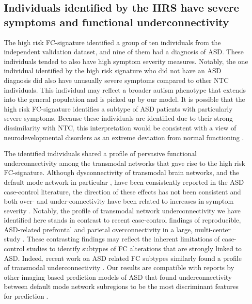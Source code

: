 \documentclass[9pt,lineno]{elife}
\begin{document}
\subsection{Individuals identified by the HRS have severe symptoms and functional underconnectivity}
The high risk FC-signature identified a group of ten individuals from the independent validation dataset, and nine of them had a diagnosis of ASD. These individuals tended to also have high symptom severity measures. Notably, the one individual identified by the high risk signature who did not have an ASD diagnosis did also have unusually severe symptoms compared to other NTC individuals. This individual may reflect a broader autism phenotype that extends into the general population \citep{Baron-Cohen2001-fx} and is picked up by our model. It is possible that the high risk FC-signature identifies a subtype of ASD patients with particularly severe symptoms. Because these individuals are identified due to their strong dissimilarity with NTC, this interpretation would be consistent with a view of neurodevelopmental disorders as an extreme deviation from normal functioning \citep{Marquand2019-ip}.

The identified individuals shared a profile of pervasive functional underconnectivity among the transmodal networks that gave rise to the high risk FC-signature. Although dysconnectivity of transmodal brain networks, and the default mode network in particular \citep{Monk2009-go}, have been consistently reported in the ASD case-control literature, the direction of these effects has not been consistent \citep{Padmanabhan2017-an,Hull2016-iu} and both over- and under-connectivity have been related to increases in symptom severity \citep{Assaf2010-jx,Supekar2013-lh}. Notably, the profile of transmodal network underconnectivity we have identified here stands in contrast to recent case-control findings of reproducible, ASD-related prefrontal and parietal overconnectivity in a large, multi-center study \citep{Holiga2019-ub}. These contrasting findings may reflect the inherent limitations of case-control studies to identify subtypes of FC alterations that are strongly linked to ASD. Indeed, recent work on ASD related FC subtypes similarly found a profile of transmodal underconnectivity \citep{Tang2019-ww}. Our results are compatible with reports by other imaging based prediction models of ASD that found underconnectivity between default mode network subregions to be the most discriminant features for prediction \citep{Abraham2017-vf,Heinsfeld2018-yl,Yahata2016-jk}.
\end{document}
